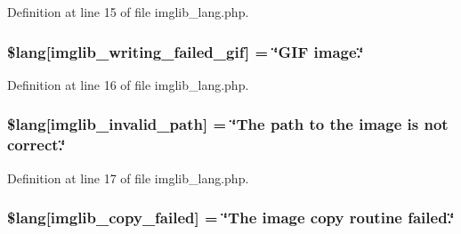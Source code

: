 Definition at line 15 of file imglib\+\_\+lang.\+php.

\subsubsection[{\texorpdfstring{\$lang}{$lang}}]{\setlength{\rightskip}{0pt plus 5cm}\$lang\mbox{[}\textquotesingle{}imglib\+\_\+writing\+\_\+failed\+\_\+gif\textquotesingle{}\mbox{]} = \char`\"{}G\+IF image.\char`\"{}}\hypertarget{application_2language_2russian_2imglib__lang_8php_a6169e9ed18d970dcc8965c4f195ae3e7}{}\label{application_2language_2russian_2imglib__lang_8php_a6169e9ed18d970dcc8965c4f195ae3e7}


Definition at line 16 of file imglib\+\_\+lang.\+php.

\subsubsection[{\texorpdfstring{\$lang}{$lang}}]{\setlength{\rightskip}{0pt plus 5cm}\$lang\mbox{[}\textquotesingle{}imglib\+\_\+invalid\+\_\+path\textquotesingle{}\mbox{]} = \char`\"{}The path to the image is not correct.\char`\"{}}\hypertarget{application_2language_2russian_2imglib__lang_8php_a8ff486c25806a4731d1ffe20431df825}{}\label{application_2language_2russian_2imglib__lang_8php_a8ff486c25806a4731d1ffe20431df825}


Definition at line 17 of file imglib\+\_\+lang.\+php.

\subsubsection[{\texorpdfstring{\$lang}{$lang}}]{\setlength{\rightskip}{0pt plus 5cm}\$lang\mbox{[}\textquotesingle{}imglib\+\_\+copy\+\_\+failed\textquotesingle{}\mbox{]} = \char`\"{}The image copy routine failed.\char`\"{}}\hypertarget{application_2language_2russian_2imglib__lang_8php_a9363000d2005b8276b39d581a11b562d}{}\label{application_2language_2russian_2imglib__lang_8php_a9363000d2005b8276b39d581a11b562d}


